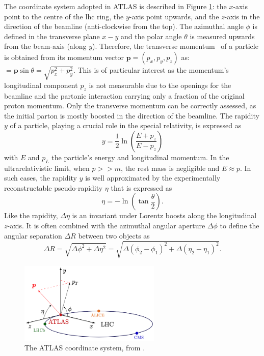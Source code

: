The coordinate system adopted in ATLAS is described in Figure \ref{fig-AtlasCoord}: the $x$-axis point to the centre of the \gls{lhc} ring, the $y$-axis point upwards, and the $z$-axis in the direction of the beamline (anti-clockwise from the top). The azimuthal angle $\phi$ is defined in the transverse plane $x-y$ and the polar angle $\theta$ is measured upwards from the beam-axis (along $y$). Therefore, the transverse momentum \pt\ of a particle is obtained from its momentum vector $\boldsymbol{p} = (p_x, p_y, p_z)$ as: \pt\ $=\boldsymbol{p} \sin\theta = \sqrt{p_x^2 + p_y^2}$. This is of particular interest as the momentum's longitudinal component $p_z$ is not measurable due to the openings for the beamline and the partonic interaction carrying only a fraction of the original proton momentum. Only the transverse momentum can be correctly assessed, as the initial parton is mostly boosted in the direction of the beamline. The rapidity $y$ of a particle, playing a crucial role in the special relativity, is expressed as 
\begin{equation}
  y = \frac{1}{2} \ln \left(\frac{E + p_z}{E - p_z}\right)
\end{equation}
with $E$ and $p_L$ the particle's energy and longitudinal momentum. In the ultrarelativistic limit, when $p >> m$, the rest mass is negligible and $E \approx p$. In such cases, the rapidity $y$ is well approximated by the experimentally reconstructable pseudo-rapidity $\eta$ that is expressed as
\begin{equation}
  \eta = -\ln \left(\tan \frac{\theta}{2}\right).
\end{equation}
Like the rapidity, $\Delta \eta$ is an invariant under Lorentz boosts along the longitudinal $z$-axis. It is often combined with the azimuthal angular aperture $\Delta \phi$ to define the angular separation $\Delta R$ between two objects as 
\begin{equation}
  \Delta R = \sqrt{\Delta \phi^2 + \Delta \eta^2} =  \sqrt{\Delta (\phi_2 - \phi_1)^2 + \Delta (\eta_2 - \eta_1)^2}.
\end{equation}

\begin{figure}[!h]
  \centering
  \hspace{+1.5cm}
  \includegraphics[width=0.6\textwidth]{Images/ATLAS/atlasCoor.png}
  \caption{The ATLAS coordinate system, from \cite{Strong:2020mge}.}
  \label{fig-AtlasCoord}
\end{figure}

